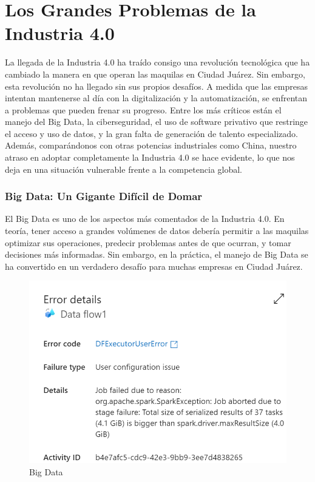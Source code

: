 \documentclass[
  letterpaper,
]{book}
\begin{document}
\section{Los Grandes Problemas de la Industria
4.0}\label{los-grandes-problemas-de-la-industria-4.0}

La llegada de la Industria 4.0 ha traído consigo una revolución
tecnológica que ha cambiado la manera en que operan las maquilas en
Ciudad Juárez. Sin embargo, esta revolución no ha llegado sin sus
propios desafíos. A medida que las empresas intentan mantenerse al día
con la digitalización y la automatización, se enfrentan a problemas que
pueden frenar su progreso. Entre los más críticos están el manejo del
Big Data, la ciberseguridad, el uso de software privativo que restringe
el acceso y uso de datos, y la gran falta de generación de talento
especializado. Además, comparándonos con otras potencias industriales
como China, nuestro atraso en adoptar completamente la Industria 4.0 se
hace evidente, lo que nos deja en una situación vulnerable frente a la
competencia global.

\subsubsection{Big Data: Un Gigante Difícil de
Domar}\label{big-data-un-gigante-difuxedcil-de-domar}

El Big Data es uno de los aspectos más comentados de la Industria 4.0.
En teoría, tener acceso a grandes volúmenes de datos debería permitir a
las maquilas optimizar sus operaciones, predecir problemas antes de que
ocurran, y tomar decisiones más informadas. Sin embargo, en la práctica,
el manejo de Big Data se ha convertido en un verdadero desafío para
muchas empresas en Ciudad Juárez.

\begin{figure}[H]

{\centering \includegraphics{Img/big.png}

}

\caption{Big Data}

\end{figure}%
\end{document}
